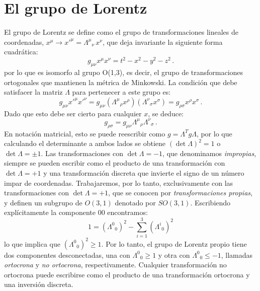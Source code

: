 \documentclass[a4paper,11pt]{book} %
\begin{document}
\section{El grupo de Lorentz}
\noindent
El grupo de Lorentz se define como el grupo de transformaciones lineales de coordenadas, $x^\mu \to x'^\mu = \Lambda^\mu{}_\nu \, x^\nu$, que deja invariante la siguiente forma cuadrática:
\begin{equation}
    g_{\mu\nu} x^\mu x^\nu = t^2 - x^2 - y^2 - z^2\,.
\end{equation}
\noindent
por lo que es isomorfo al grupo O(1,3), es decir, el grupo de transformaciones ortogonales que mantienen la métrica de Minkowski.
\medskip\newline
La condición que debe satisfacer la matriz $\Lambda$ para pertenecer a este grupo es:
\begin{equation}
    g_{\mu\nu} x'^\mu x'^\nu = g_{\mu\nu}(\Lambda^\mu{}_\rho x^\rho)(\Lambda^\nu{}_\sigma x^\sigma) = g_{\rho\sigma} x^\rho x^\sigma\,.
\end{equation}
Dado que esto debe ser cierto para cualquier $x$, se deduce:
\begin{equation}
    g_{\rho\sigma} = g_{\mu\nu}\Lambda^\mu{}_\rho \Lambda^\nu{}_\sigma\,.
\end{equation}
\noindent
En notación matricial, esto se puede reescribir como $g = \Lambda^T g \Lambda$, por lo que calculando el determinante a ambos lados se obtiene $(\det\Lambda)^2 = 1$ o $\det\Lambda = \pm 1$.
\medskip\newline
Las transformaciones con $\det\Lambda = -1$, que denominamos \textit{impropias}, siempre se pueden escribir como el producto de una transformación con $\det\Lambda = +1$ y una transformación discreta que invierte el signo de un número impar de coordenadas. Trabajaremos, por lo tanto, exclusivamente con las transformaciones con $\det\Lambda = +1$, que se conocen por \textit{transformaciones propias}, y definen un subgrupo de $O(3,1)$ denotado por $SO(3,1)$.
\medskip\newline
Escribiendo explícitamente la componente $00$ encontramos:
\begin{equation}
    1 = (\Lambda^0{}_0)^2 - \sum_{i=1}^{3}(\Lambda^i{}_0)^2
\end{equation}
lo que implica que $(\Lambda^0{}_0)^2 \geq 1$. Por lo tanto, el grupo de Lorentz propio tiene dos componentes desconectadas, una con $\Lambda^0{}_0 \geq 1$ y otra con $\Lambda^0{}_0 \leq -1$, llamadas \textit{ortocrona} y \textit{no ortocrona}, respectivamente. Cualquier transformación no ortocrona puede escribirse como el producto de una transformación ortocrona y una inversión discreta.
\end{document}
